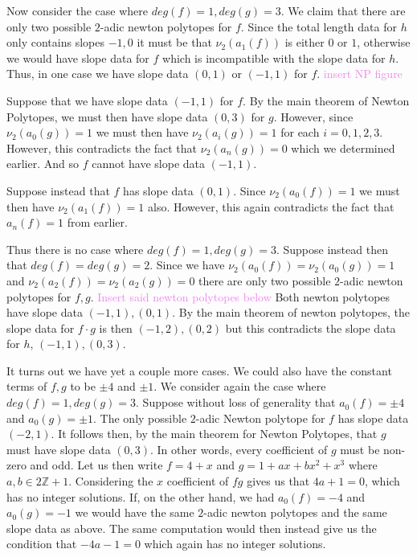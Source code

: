\documentclass[12pt,letterpaper,boxed]{hmcpset}
\newcommand{\wg}[1]{\textcolor{violet}{#1}}
\newcommand{\Z}{\mathbb Z}
\begin{document}
\begin{solution}
\begin{itemize}
Now consider the case where $deg(f) = 1, deg(g) = 3$.
We claim that there are only two possible $2$-adic newton polytopes
for $f$. Since the total length data for $h$ only contains slopes
$-1,0$ it must be that $\nu_2(a_1(f))$ is either $0$ or $1$, otherwise
we would have slope data for $f$ which is incompatible with the slope
data for $h$.
Thus, in one case we have slope data $(0,1)$ or $(-1,1)$ for $f$. 
\wg{insert NP figure}

Suppose that we have slope data $(-1,1)$ for $f$. 
By the main theorem of Newton Polytopes, we must then have slope
data $(0,3)$ for $g$. However, since $\nu_2(a_0(g)) = 1$ we must then
have $\nu_2(a_i(g)) = 1$ for each $i=0,1,2,3$. However, this
contradicts the fact that $\nu_2(a_n(g)) = 0$ which we determined
earlier. And so $f$ cannot have slope data $(-1,1)$.

Suppose instead that $f$ has slope data $(0,1)$. Since $\nu_2(a_0(f))
= 1$ we must then have $\nu_2(a_1(f)) = 1$ also. However, this again
contradicts the fact that $a_n(f) = 1$ from earlier.

Thus there is no case where $deg(f) = 1, deg(g) = 3$. Suppose instead
then that $deg(f) = deg(g) = 2$. Since we have $\nu_2(a_0(f)) =
\nu_2(a_0(g)) = 1$ and $\nu_2(a_2(f)) = \nu_2(a_2(g)) = 0$ there are
only two possible $2$-adic newton polytopes for $f,g$.
\wg{Insert said newton polytopes below}
Both newton polytopes have slope data $(-1,1),(0,1)$. By the main
theorem of newton polytopes, the slope data for $f\cdot g$ is then 
$(-1, 2), (0,2)$ but this contradicts the slope data for $h$, $(-1,1),
(0,3)$.

It turns out we have yet a couple more cases. We could also have
the constant terms of $f,g$ to be $\pm 4$ and $\pm 1$.
We consider again the case where $deg(f) = 1, deg(g) = 3$.
Suppose without loss of generality that $a_0(f) = \pm 4$ and $a_0(g) =
\pm 1$. The only possible $2$-adic Newton polytope for $f$ has slope
data $(-2,1)$. It follows then, by the main theorem for Newton
Polytopes, that $g$ must have slope data $(0, 3)$. In other words,
every coefficient of $g$ must be non-zero and odd. Let us then write
$f = 4 + x$ and $g = 1 + ax + bx^2 + x^3$ where $a,b \in 2\Z + 1$. 
Considering the $x$ coefficient of $fg$ gives us that $4a + 1 = 0$,
which has no integer solutions. If, on the other hand, we had $a_0(f)
= -4$ and $a_0(g) = -1$ we would have the same $2$-adic newton
polytopes and the same slope data as above. The same computation would
then instead give us the condition that $-4a - 1 = 0$ which again has
no integer solutions. 


\end{itemize}
\end{solution}
\end{document}
